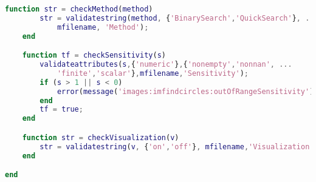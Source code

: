 \begin{lstlisting}[language=MATLAB, caption=Verfeinerung der lokalen Minima, label=lst:calculateSurfaceByDIP]
    function str = checkMethod(method)
        str = validatestring(method, {'BinarySearch','QuickSearch'}, ...
            mfilename, 'Method');
    end

    function tf = checkSensitivity(s)
        validateattributes(s,{'numeric'},{'nonempty','nonnan', ...
            'finite','scalar'},mfilename,'Sensitivity');
        if (s > 1 || s < 0)
            error(message('images:imfindcircles:outOfRangeSensitivity'));
        end
        tf = true;
    end

    function str = checkVisualization(v)
        str = validatestring(v, {'on','off'}, mfilename,'Visualization');
    end

end
\end{lstlisting}
